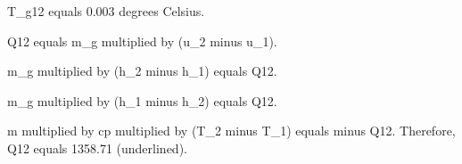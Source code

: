T_g12 equals 0.003 degrees Celsius.  

Q12 equals m_g multiplied by (u_2 minus u_1).  

m_g multiplied by (h_2 minus h_1) equals Q12.  

m_g multiplied by (h_1 minus h_2) equals Q12.  

m multiplied by cp multiplied by (T_2 minus T_1) equals minus Q12.  
Therefore, Q12 equals 1358.71 (underlined).